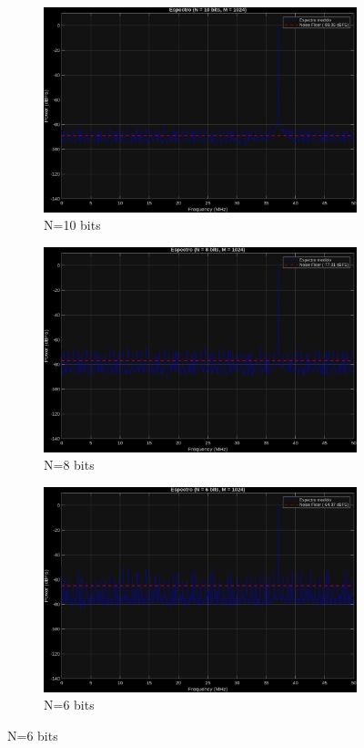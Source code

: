 \begin{figure}[H]
    \begin{subfigure}[t]{.5\textwidth}
        \centering
        \includegraphics[width=\linewidth]{img/task4_3_n10.png}
        \caption{N=10 bits}
    \end{subfigure}
    \begin{subfigure}[t]{.5\textwidth}
        \centering
        \includegraphics[width=\linewidth]{img/task4_3_n8.png}
        \caption{N=8 bits}
    \end{subfigure}
    \begin{subfigure}[t]{.5\textwidth}
        \centering
        \includegraphics[width=\linewidth]{img/task4_3_n6.png}
        \caption{N=6 bits}
    \end{subfigure}
\end{figure}
